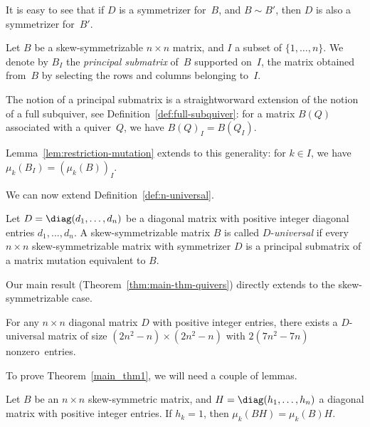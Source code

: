 It is easy to see that if $D$ is a symmetrizer for~$B$, and $B\sim B'$, then $D$ is also a symmetrizer for~$B'$. 

\begin{definition}
Let $B$ be a skew-symmetrizable $n\times n$ matrix, and $I$ a subset of $\{1,\dots,n\}$. We denote by $B_I$ the \emph{principal submatrix} of~$B$ supported on~$I$, \ie the matrix obtained from~$B$ by selecting the rows and columns belonging to~$I$. 
\end{definition}

\begin{remark}
The notion of a principal submatrix is a straightworward extension of the notion of a full subquiver, see Definition~\ref{def:full-subquiver}: for a matrix $B(Q)$ associated with a quiver~$Q$, we have $B(Q)_I=B(Q_I)$. 

Lemma~\ref{lem:restriction-mutation} extends to this generality: for $k\in I$, we have $\mu_k(B_I)=(\mu_k(B))_I$. 
\end{remark}


We can now extend Definition~\ref{def:n-universal}. 

\begin{definition}
Let $D=\diag (d_1,\dots,d_n)$ be a diagonal matrix with positive integer diagonal entries $d_1,...,d_n$. 
A skew-symmetrizable matrix $B$ is called $D$-\emph{universal} if every $n\times n$ skew-symmetrizable matrix with symmetrizer $D$ is a principal submatrix of a matrix mutation equivalent to $B$. 
\end{definition}

Our main result (Theorem~\ref{thm:main-thm-quivers}) directly extends to the skew-symmetrizable case. 

\begin{theorem}
\label{main_thm1}
For any $n\times n$ diagonal matrix $D$ with positive integer entries, there exists a $D$-universal matrix of size $(2n^2\!-\!n)\!\times\!(2n^2\!-\!n)$ with $2(7n^2\!-\!7n)$ nonzero~entries. 
\end{theorem}

To prove Theorem~\ref{main_thm1}, we will need a couple of lemmas. 

\begin{lemma}
\label{lem:mu-BD}
Let $B$ be an $n\times n$ skew-symmetric matrix, and $H=\diag (h_1,\dots,h_n)$ a diagonal matrix with positive integer entries. If $h_k=1$, then $\mu_k(BH)=\mu_k(B)H$. 
\end{lemma}

